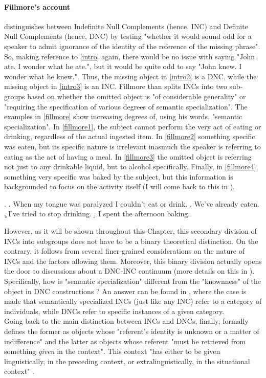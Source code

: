 \paragraph{Fillmore's account}
\textcite[96]{Fillmore1986} distinguishes between Indefinite Null Complements (hence, INC) and Definite Null Complements (hence, DNC) by testing "whether it would sound odd for a speaker to admit ignorance of the identity of the reference of the missing phrase". So, making reference to \ref{intro} again, there would be no issue with saying "John ate. I wonder what he ate.", but it would be quite odd to say "John knew. I wonder what he knew.". Thus, the missing object in \ref{intro2} is a DNC, while the missing object in \ref{intro3} is an INC. Fillmore than splits INCs into two sub-groups based on whether the omitted object is "of considerable generality" or "requiring the specification of various degrees of semantic specialization". The examples in \ref{fillmore} \parencite[96-97]{Fillmore1986} show increasing degrees of, using his words, "semantic specialization". In \ref{fillmore1}, the subject cannot perform the very act of eating or drinking, regardless of the actual ingested item. In \ref{fillmore2} something specific was eaten, but its specific nature is irrelevant inasmuch the speaker is referring to eating as the act of having a meal. In \ref{fillmore3} the omitted object is referring not just to any drinkable liquid, but to alcohol specifically. Finally, in \ref{fillmore4} something very specific was baked by the subject, but this information is backgrounded to focus on the activity itself (I will come back to this in ).

\ex. \label{fillmore} \a. \label{fillmore1} When my tongue was paralyzed I couldn't eat or drink.
\b. \label{fillmore2} We've already eaten.
\c. \label{fillmore3} I've tried to stop drinking.
\d. \label{fillmore4} I spent the afternoon baking.

However, as it will be shown throughout this Chapter, this secondary division of INCs into subgroups does not have to be a binary theoretical distinction. On the contrary, it follows from several finer-grained considerations on the nature of INCs and the factors allowing them. Moreover, this binary division actually opens the door to discussions about a DNC-INC continuum (more details on this in ). Specifically, how is "semantic specialization" different from the "knownness" of the object in DNC constructions \parencite[525]{Eu2018}? An answer can be found in \textcite[218]{Allerton1975}, where the case is made that semantically specialized INCs (just like any INC) refer to a category of individuals, while DNCs refer to specific instances of a given category.\\
Going back to the main distinction between INCs and DNCs, finally, \textcite{Fillmore1986} formally defines the former as objects whose "referent's identity is unknown or a matter of indifference" and the latter as objects whose referent "must be retrieved from something \textit{given} in the context". This context "has either to be given linguistically, in the preceding context, or extralinguistically, in the situational context" \parencite[13]{StarkMeier2017}.

